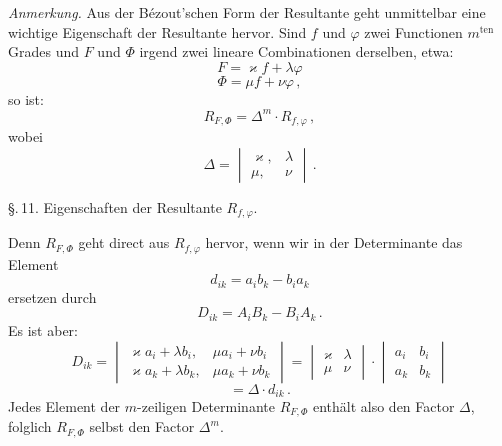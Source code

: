 \documentclass[11pt]{article}
\providecommand{\weberpage}[1]{}
\let\Delta\varDelta
\let\Phi\varPhi
\begin{document}
\textit{Anmerkung.} Aus der B\'ezout'schen Form der Resultante geht
unmittelbar eine wichtige Eigenschaft der Resultante hervor. Sind $f$
und $\varphi$ zwei Functionen $m^{\mathrm{ten}}$ Grades und $F$ und $\Phi$
irgend zwei lineare Combinationen derselben, etwa:
\[
F = \varkappa f + \lambda \varphi
\]
\[
\Phi = \mu f + \nu \varphi\,,
\]
so ist:
\[
R_{F,\Phi} = \Delta^m \cdot R_{f,\varphi}\,,
\]
wobei
\[
\Delta = \begin{vmatrix} \varkappa, & \lambda \\ \mu, & \nu \end{vmatrix}\,.
\]


\weberpage{161}
\S.\,11. Eigenschaften der Resultante $R_{f,\varphi}$.

Denn $R_{F,\Phi}$ geht direct aus $R_{f,\varphi}$ hervor, wenn wir in der
Determinante das Element
\[
d_{ik} = a_i b_k - b_i a_k
\]
ersetzen durch
\[
D_{ik} = A_i B_k - B_i A_k\,.
\]
Es ist aber:
\[
D_{ik} = \begin{vmatrix} \varkappa a_i + \lambda b_i, & \mu a_i + \nu b_i \\ \varkappa a_k + \lambda b_k, & \mu a_k + \nu b_k \end{vmatrix}
= \begin{vmatrix} \varkappa & \lambda \\ \mu & \nu \end{vmatrix} \cdot \begin{vmatrix} a_i & b_i \\ a_k & b_k \end{vmatrix}
\]
\[
= \Delta \cdot d_{ik}\,.
\]
Jedes Element der $m$-zeiligen Determinante $R_{F,\Phi}$ enth\"alt also
den Factor $\Delta$, folglich $R_{F,\Phi}$ selbst den Factor $\Delta^m$.
\end{document}
